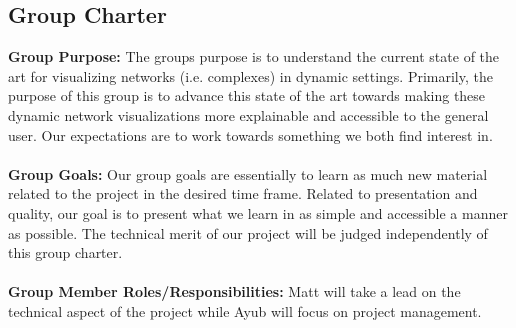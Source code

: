 \documentclass{vgtc}                          %
\begin{document}
\subsection{Group Charter}
\noindent 
\textbf{Group Purpose:} The groups purpose is to understand the current state of the art for visualizing networks (i.e. complexes) in dynamic settings. Primarily, the purpose of this group is to advance this state of the art towards making these dynamic network visualizations more explainable and accessible to the general user. Our expectations are to work towards something we both find interest in. 
\\
\\
\noindent
\textbf{Group Goals:}
Our group goals are essentially to learn as much new material related to the project in the desired time frame. Related to presentation and quality, our goal is to present what we learn in as simple and accessible a manner as possible. The technical merit of our project will be judged independently of this group charter.
\\
\\
\noindent
\textbf{Group Member Roles/Responsibilities:} Matt will take a lead on the technical aspect of the project while Ayub will focus on project management. 
\\
\\
\end{document}

